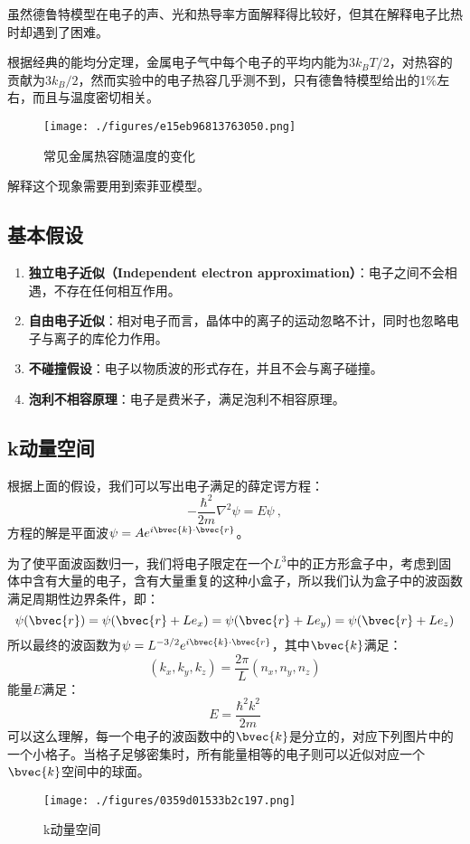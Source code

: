 

虽然德鲁特模型在电子的声、光和热导率方面解释得比较好，但其在解释电子比热时却遇到了困难。

根据经典的能均分定理，金属电子气中每个电子的平均内能为$3k_BT/2$，对热容的贡献为$3k_B/2$，然而实验中的电子热容几乎测不到，只有德鲁特模型给出的1\%左右，而且与温度密切相关。
\begin{figure}[ht]
\centering
\texttt{[image: ./figures/e15eb96813763050.png]}
\caption{常见金属热容随温度的变化} \label{fig_SMFM_1}
\end{figure}
解释这个现象需要用到索菲亚模型。
\subsection{基本假设}
\begin{enumerate}
\item \textbf{独立电子近似（Independent electron approximation）}：电子之间不会相遇，不存在任何相互作用。
\item \textbf{自由电子近似}：相对电子而言，晶体中的离子的运动忽略不计，同时也忽略电子与离子的库伦力作用。
\item \textbf{不碰撞假设}：电子以物质波的形式存在，并且不会与离子碰撞。
\item \textbf{泡利不相容原理}：电子是费米子，满足泡利不相容原理。
\end{enumerate}
\subsection{k动量空间}
根据上面的假设，我们可以写出电子满足的薛定谔方程：
\begin{equation}
-\frac{\hbar^2}{2m}\nabla^2\psi=E\psi~,
\end{equation}
方程的解是平面波$\psi=Ae^{i\bvec{k}\cdot \bvec{r}}$。

为了使平面波函数归一，我们将电子限定在一个$L^3$中的正方形盒子中，考虑到固体中含有大量的电子，含有大量重复的这种小盒子，所以我们认为盒子中的波函数满足周期性边界条件，即：
\begin{equation}
\psi(\bvec{r})=\psi(\bvec{r}+Le_x)=\psi(\bvec{r}+Le_y)=\psi(\bvec{r}+Le_z)
\end{equation}
所以最终的波函数为$\psi=L^{-3/2}e^{i\bvec{k}\cdot \bvec{r}}$，其中$\bvec{k}$满足：
\begin{equation}
\left (k_x, k_y, k_z\right )=\frac{2\pi}{L}\left(n_x, n_y, n_z\right )
\end{equation}
能量$E$满足：
\begin{equation}
E=\frac{\hbar ^2 k^2}{2m}
\end{equation}
可以这么理解，每一个电子的波函数中的$\bvec{k}$是分立的，对应下列图片中的一个小格子。当格子足够密集时，所有能量相等的电子则可以近似对应一个$\bvec{k}$空间中的球面。
\begin{figure}[ht]
\centering
\texttt{[image: ./figures/0359d01533b2c197.png]}
\caption{k动量空间} \label{fig_SMFM_2}
\end{figure}
